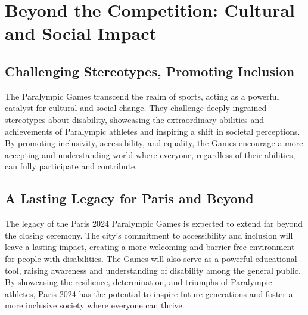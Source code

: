 \section{Beyond the Competition: Cultural and Social Impact}

\subsection{Challenging Stereotypes, Promoting Inclusion}
The Paralympic Games transcend the realm of sports, acting as a powerful catalyst for cultural and social change. They challenge deeply ingrained stereotypes about disability, showcasing the extraordinary abilities and achievements of Paralympic athletes and inspiring a shift in societal perceptions. By promoting inclusivity, accessibility, and equality, the Games encourage a more accepting and understanding world where everyone, regardless of their abilities, can fully participate and contribute.

\subsection{A Lasting Legacy for Paris and Beyond}

The legacy of the Paris 2024 Paralympic Games is expected to extend far beyond the closing ceremony. The city's commitment to accessibility and inclusion will leave a lasting impact, creating a more welcoming and barrier-free environment for people with disabilities. The Games will also serve as a powerful educational tool, raising awareness and understanding of disability among the general public. By showcasing the resilience, determination, and triumphs of Paralympic athletes, Paris 2024 has the potential to inspire future generations and foster a more inclusive society where everyone can thrive.
